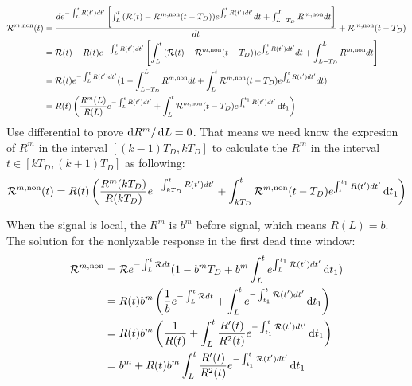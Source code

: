\begin{equation}
\begin{aligned}
\mathcal{R}^{m,\mathrm{non}}(t)&=\frac{d e^{-\int_{L}^{t}{R(t')dt'}}\left[\int_{L}^{t}{(\mathcal{R}(t)-\mathcal{R}^{m,\mathrm{non}}(t-T_D))e^{\int_{L}^{t}{R(t')dt'}}dt} + \int_{L-T_D}^{L}{R^{m,\mathrm{non}}dt}\right]}{dt}+\mathcal{R}^{m,\mathrm{non}}(t-T_D)\\
&=\mathcal{R}(t)-R(t)e^{-\int_{L}^{t}{R(t')dt'}}\left[\int_{L}^{t}{(\mathcal{R}(t)-\mathcal{R}^{m,\mathrm{non}}(t-T_D))e^{\int_{L}^{t}{R(t')dt'}}dt}+\int_{L-T_D}^{L}{R^{m,\mathrm{non}}dt}\right]\\
&=\mathcal{R}(t)e^{-\int_{L}^{t}{R(t')dt'}}(1-\int_{L-T_D}^{L}{R^{m,\mathrm{non}}dt}+\int_{L}^{t}{\mathcal{R}^{m,\mathrm{non}}(t-T_D)e^{\int_{L}^{t}{R(t')dt'}}dt})\\
&=R(t)\left(\frac{R^m(L)}{R(L)}e^{-\int_{L}^{t}{R(t')dt'}}+\int_{L}^{t}{\mathcal{R}^{m,\mathrm{non}}(t-T_D)e^{\int_{t}^{t_1}{R(t')dt'}}\mathop{}\!\mathrm{d} t_1}\right)
\end{aligned}
\end{equation}
Use differential to prove $\mathop{}\!\mathrm{d} R^m/\mathop{}\!\mathrm{d} L=0$. That means we need know the expresion of $R^m$ in the interval $[(k-1)T_D,kT_D]$ to calculate the $R^m$ in the interval $t\in[kT_D, (k+1)T_D]$ as following: 
\begin{equation}
\mathcal{R}^{m,\mathrm{non}}(t) = R(t)\left(\frac{R^m(kT_D)}{R(kT_D)}e^{-\int_{kT_D}^{t}{R(t')dt'}}+\int_{kT_D}^{t}{\mathcal{R}^{m,\mathrm{non}}(t-T_D)e^{\int_{t}^{t_1}{R(t')dt'}}\mathop{}\!\mathrm{d} t_1}\right)
\end{equation}

When the signal is local, the $R^m$ is $b^m$ before signal, which means $R(L)=b$. The solution for the nonlyzable response in the first dead time window:
\begin{equation}
\begin{aligned}
	\mathcal{R}^{m,\mathrm{non}}&=\mathcal{R}e^{-\int_{L}^t{\mathcal{R}dt}}(1-b^mT_D+b^m\int^{t}_{L}{e^{\int_{L}^{t_1}{\mathcal{R}(t')dt'}}\mathop{}\!\mathrm{d} t_1})\\
	&=R(t)b^m\left(\frac{1}{b}e^{-\int_{L}^t{\mathcal{R}dt}}+\int^{t}_{L}{e^{-\int_{t_1}^{t}{\mathcal{R}(t')dt'}}\mathop{}\!\mathrm{d} t_1}\right)\\
	&=R(t)b^m\left(\frac{1}{R(t)}+\int^{t}_{L}{\frac{R'(t)}{R^2(t)}e^{-\int_{t_1}^{t}{\mathcal{R}(t')dt'}}\mathop{}\!\mathrm{d} t_1}\right)\\
	&=b^m + R(t)b^m\int^{t}_{L}{\frac{R'(t)}{R^2(t)}e^{-\int_{t_1}^{t}{\mathcal{R}(t')dt'}}\mathop{}\!\mathrm{d} t_1}
\end{aligned}
\end{equation}

